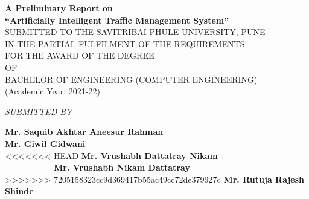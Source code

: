 \documentclass[openany,12pt]{report}
\begin{document}
	\lhead{}
	\chead{}
	\setlength{\headrulewidth}{0.4pt}
	\setlength{\footrulewidth}{0.4pt}
	\fontsize{12}{15}
	\begin{titlepage}
		\begin{center}
			{\bf A Preliminary Report on} \\
			\vspace{0.3in}
			{\Large \bf ``Artificially Intelligent Traffic Management System''}\\
			\vspace{0.3in}
			SUBMITTED TO THE SAVITRIBAI PHULE UNIVERSITY, PUNE\\
			IN THE PARTIAL FULFILMENT OF THE REQUIREMENTS \\
			FOR THE AWARD OF THE DEGREE \\
			\vspace{0.2in}
			OF\\  
			\vspace{0.2in}
			BACHELOR OF ENGINEERING (COMPUTER ENGINEERING)\\
			(Academic Year: 2021-22)\\
			\vspace{0.2in}
			
			{\it SUBMITTED BY}\\
			
			\vspace{0.2in}
			
			{\bf Mr. Saquib Akhtar Aneesur Rahman}\\
			{\bf Mr. Giwil Gidwani }\\
<<<<<<< HEAD
			{\bf Mr. Vrushabh Dattatray Nikam     }\\
=======
			{\bf Mr. Vrushabh Nikam Dattatray     }\\
>>>>>>> 7205158323cc9d369417b55ac49cc72de379927c
			{\bf Mr. Rutuja Rajesh Shinde    }\\
			

\end{center}
\end{titlepage}
\end{document}
